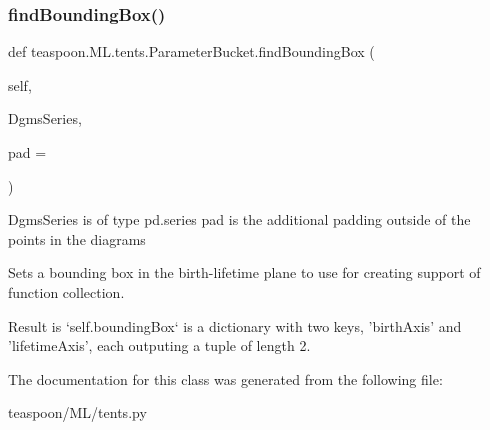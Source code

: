 \subsubsection{\texorpdfstring{find\+Bounding\+Box()}{findBoundingBox()}}
{\footnotesize\ttfamily def teaspoon.\+M\+L.\+tents.\+Parameter\+Bucket.\+find\+Bounding\+Box (\begin{DoxyParamCaption}\item[{}]{self,  }\item[{}]{Dgms\+Series,  }\item[{}]{pad = {} }\end{DoxyParamCaption})}

\begin{DoxyVerb}DgmsSeries is of type pd.series
pad is the additional padding outside of the points in the diagrams


Sets a bounding box in the birth-lifetime plane
to use for creating support of function collection.

Result is `self.boundingBox` is a dictionary with
two keys, 'birthAxis' and 'lifetimeAxis', each outputing
a tuple of length 2.\end{DoxyVerb}


The documentation for this class was generated from the following file\+:\begin{DoxyCompactItemize}
\item
teaspoon/\+M\+L/tents.\+py\end{DoxyCompactItemize}
